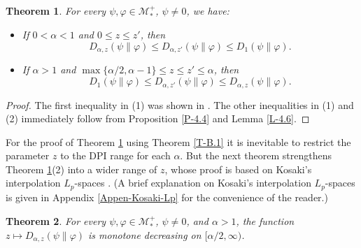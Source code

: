 \documentclass[12pt]{article}
\newtheorem{theorem}{Theorem}[section]
\theoremstyle{definition}
\theoremstyle{remark}
\numberwithin{equation}{section}
\def\Me{\mathcal M}
\def\ffi{\varphi}
\begin{document}
\begin{theorem}\label{T-4.7}
For every $\psi,\ffi\in\Me_*^+$, $\psi\ne0$, we have:
\begin{itemize}
\item[(1)] If $0<\alpha<1$ and {\color{red}$0\le z\le z'$,} then
\[
D_{\alpha,z}(\psi\|\ffi)\le D_{\alpha,z'}(\psi\|\ffi)\le D_1(\psi\|\ffi).
\]
\item[(2)] If $\alpha>1$ and $\max\{\alpha/2,\alpha-1\}\le z\le z'\le\alpha$, then
\[
D_1(\psi\|\ffi)\le D_{\alpha,z'}(\psi\|\ffi)\le D_{\alpha,z}(\psi\|\ffi).
\]
\end{itemize}
\end{theorem}

{\color{red}
\begin{proof}
The first inequality in (1) was shown in \cite[Theorem 1(x)]{kato2023onrenyi}. The other inequalities in (1)
and (2) immediately follow from Proposition \ref{P-4.4} and Lemma \ref{L-4.6}.
\end{proof}
}

For the proof of Theorem \ref{T-4.7} using Theorem \ref{T-B.1} it is inevitable to restrict the parameter $z$
to the DPI range for each $\alpha$. But the next theorem strengthens Theorem \ref{T-4.7}(2) into a wider
range of $z$, whose proof is based on Kosaki's interpolation $L_p$-spaces \cite{kosaki1984applications}.
(A brief explanation on Kosaki's interpolation $L_p$-spaces is given in Appendix \ref{Appen-Kosaki-Lp} for
the convenience of the reader.)

\begin{theorem}\label{T-4.8}
For every $\psi,\ffi\in\Me_*^+$, $\psi\ne0$, and $\alpha>1$, the function $z\mapsto D_{\alpha,z}(\psi\|\varphi)$
is monotone decreasing on $[\alpha/2,\infty)$.
\end{theorem}
\end{document}
